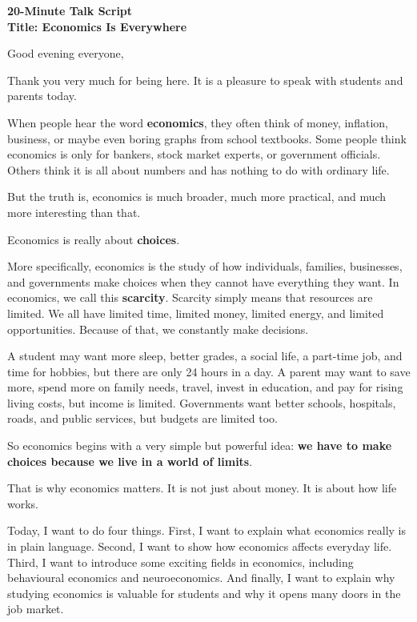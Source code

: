 \documentclass[12pt]{article}
\begin{document}
\begin{center}
    {\LARGE \textbf{20-Minute Talk Script}}\\[0.5em]
    {\large \textbf{Title: Economics Is Everywhere}}
\end{center}

\vspace{1em}

Good evening everyone,

Thank you very much for being here. It is a pleasure to speak with students and parents today.

When people hear the word \textbf{economics}, they often think of money, inflation, business, or maybe even boring graphs from school textbooks. Some people think economics is only for bankers, stock market experts, or government officials. Others think it is all about numbers and has nothing to do with ordinary life.

But the truth is, economics is much broader, much more practical, and much more interesting than that.

Economics is really about \textbf{choices}.

More specifically, economics is the study of how individuals, families, businesses, and governments make choices when they cannot have everything they want. In economics, we call this \textbf{scarcity}. Scarcity simply means that resources are limited. We all have limited time, limited money, limited energy, and limited opportunities. Because of that, we constantly make decisions.

A student may want more sleep, better grades, a social life, a part-time job, and time for hobbies, but there are only 24 hours in a day. A parent may want to save more, spend more on family needs, travel, invest in education, and pay for rising living costs, but income is limited. Governments want better schools, hospitals, roads, and public services, but budgets are limited too.

So economics begins with a very simple but powerful idea: \textbf{we have to make choices because we live in a world of limits}.

That is why economics matters. It is not just about money. It is about how life works.

Today, I want to do four things. First, I want to explain what economics really is in plain language. Second, I want to show how economics affects everyday life. Third, I want to introduce some exciting fields in economics, including behavioural economics and neuroeconomics. And finally, I want to explain why studying economics is valuable for students and why it opens many doors in the job market.
\end{document}
